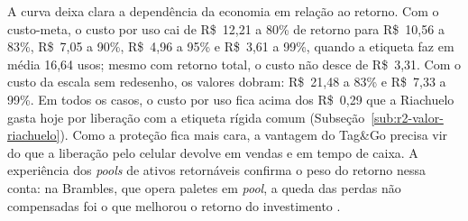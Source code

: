 \begin{figure}[htbp]
\end{figure}

A curva deixa clara a dependência da economia em relação ao retorno. Com o custo-meta, o custo por uso cai de R\$~12,21 a 80\% de retorno para R\$~10,56 a 83\%, R\$~7,05 a 90\%, R\$~4,96 a 95\% e R\$~3,61 a 99\%, quando a etiqueta faz em média 16,64 usos; mesmo com retorno total, o custo não desce de R\$~3,31. Com o custo da escala sem redesenho, os valores dobram: R\$~21,48 a 83\% e R\$~7,33 a 99\%. Em todos os casos, o custo por uso fica acima dos R\$~0,29 que a Riachuelo gasta hoje por liberação com a etiqueta rígida comum (Subseção~\ref{sub:r2-valor-riachuelo}). Como a proteção fica mais cara, a vantagem do Tag\&Go precisa vir do que a liberação pelo celular devolve em vendas e em tempo de caixa. A experiência dos \textit{pools} de ativos retornáveis confirma o peso do retorno nessa conta: na Brambles, que opera paletes em \textit{pool}, a queda das perdas não compensadas foi o que melhorou o retorno do investimento \cite{brambles2025resultados}.

